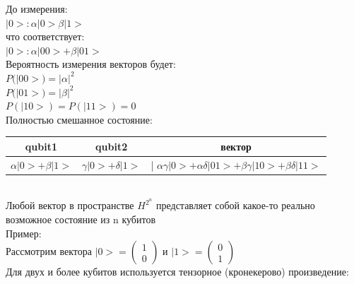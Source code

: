 \documentclass[11pt]{report}
\begin{document}
До измерения:\\

$|0> : \alpha |0> \beta |1>$ \\

что соответствует: \\

$|0> : \alpha |00> + \beta |01>$ \\

Вероятность измерения векторов будет: \\

$P(|00>) = |\alpha|^2$ \\

$P(|01>) = |\beta|^2$ \\

$P(|10>) = P(|11>) = 0$ \\


Полностью смешанное состояние: \\

\begin{tabular}{|c|c|c|}
\hline
	qubit1 & qubit2 & вектор\\
\hline
	$\alpha|0> + \beta|1>$ & $\gamma|0> + \delta|1>$ & | $\alpha \gamma |0> + \alpha \delta|01> + \beta \gamma |10> + \beta\delta|11>$ \\
	\hline
\end{tabular}\\

Любой вектор в пространстве $H^{2^n}$ представляет собой какое-то реально возможное состояние из n кубитов\\ 

Пример:\\

Рассмотрим вектора $|0>=\begin{pmatrix}
1 \\
0
\end{pmatrix}$ 
и 
$|1>=\begin{pmatrix}
0 \\
1
\end{pmatrix}$ \\

Для двух и более кубитов используется тензорное (кронекерово) произведение:\\
\end{document}

